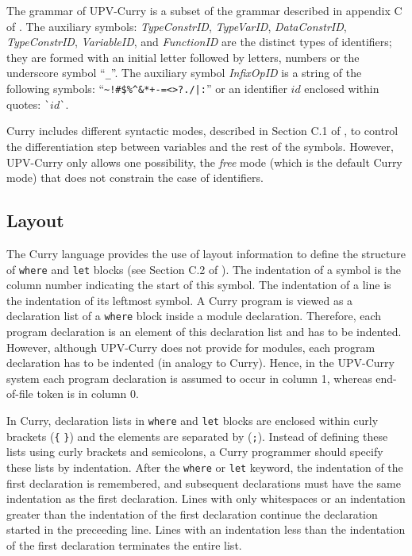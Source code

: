 \documentclass[titlepage,fleqn]{article}
\newcommand{\pr}[1]{\mbox{\tt #1}}   %
\begin{document}
The grammar of UPV-Curry  is a subset of the grammar described in
appendix C of \cite{Hanus98Curry}.
The auxiliary symbols: {\em TypeConstrID}, {\em TypeVarID}, {\em DataConstrID},
{\em TypeConstrID}, {\em VariableID}, and {\em FunctionID} are the
distinct types of identifiers; they are formed with an initial letter followed
by letters, numbers or the underscore symbol ``\pr{\_}''.
The auxiliary symbol {\em InfixOpID} is a string of the following symbols:
``\pr{\~{}!\@\#\$\%\^{}\&*+-=<>?./|:}'' or an identifier $id$
enclosed within quotes: \verb+`+$id$\verb+`+.

Curry includes different syntactic modes, described in Section
C.1 of \cite{Hanus98Curry}, to control the differentiation step between
variables and the rest of the symbols.
However, UPV-Curry only allows one possibility, the {\em free} mode
(which is the default Curry mode) 
that does not constrain the case of identifiers.

\subsection{Layout}
The Curry language provides the use of layout information to define the
structure of \pr{where} and \pr{let} blocks (see Section C.2 of
\cite{Hanus98Curry}).
The indentation of a symbol is the column number indicating the
start of this symbol. 
The indentation of a line is the indentation of its leftmost
symbol.
A Curry program is viewed as a declaration list of a
\pr{where} block inside a module declaration.
Therefore, each program declaration is an
element of this declaration list and has to be indented.
However, although UPV-Curry does not provide for modules,
each program declaration has to be indented
(in analogy to Curry).
Hence, 
in the UPV-Curry system 
each program declaration is assumed to occur in column 1,
whereas end-of-file token is in column 0.

In Curry, declaration lists in \pr{where} and \pr{let} blocks are enclosed
within curly brackets (\pr{\{} \pr{\}}) and the elements are
separated by (\pr{;}). 
Instead of defining these lists using
curly brackets and semicolons, a Curry programmer should specify
these lists by indentation.
After the \pr{where} or \pr{let} keyword, the indentation of the
first declaration is remembered, and subsequent declarations 
must have the same indentation as the first declaration. 
Lines with only whitespaces or an indentation greater than the
indentation of the first declaration continue the declaration 
started in the preceeding line. 
Lines with an indentation less than the
indentation of the first declaration terminates the entire list.
\end{document}
